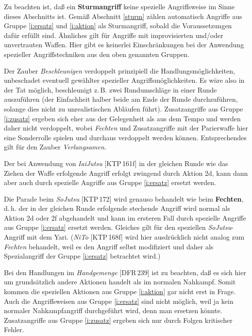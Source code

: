 \documentclass[10pt,a4paper,germanpar]{article}
\begin{document}
Zu beachten ist, daß ein \textbf{Sturmangriff} keine spezielle
Angriffsweise im Sinne dieses Abschnitts ist. Gemäß Abschnitt
\ref{sturm} zählen automatisch Angriffe aus Gruppe \ref{i:ersatz} und
\ref{i:aktion} als Sturmangriff, sobald die Voraussetzungen dafür
erfüllt sind. Ähnliches gilt für Angriffe mit improvisierten und/oder
unvertrauten Waffen. Hier gibt es keinerlei Einschränkungen bei der
Anwendung spezieller Angriffstechniken aus den oben genannten Gruppen.

Der Zauber \emph{Beschleunigen} verdoppelt prinzipiell die
Handlungsmöglichkeiten, unbeschadet eventuell gewählter spezieller
Angriffsmöglichkeiten. Es wäre also in der Tat möglich, beschleunigt
z.\,B. zwei Rundumschläge in einer Runde auszuführen (der Einfachheit
halber beide am Ende der Runde durchzuführen, solange dies nicht zu
unrealistischen Abläufen führt). Zusatzangriffe aus Gruppe
\ref{i:zusatz} ergeben sich eher aus der Gelegenheit als aus dem Tempo
und werden daher nicht verdoppelt, wobei \emph{Fechten} und
Zusatzangriffe mit der Parierwaffe hier eine Sonderrolle spielen und
durchaus verdoppelt werden können. Entsprechendes gilt für den Zauber
\emph{Verlangsamen}.

Der bei Anwendung von \emph{IaiJutsu} [KTP\,161f] in der gleichen
Runde wie das Ziehen der Waffe erfolgende Angriff erfolgt zwingend
durch Aktion 2d, kann dann aber auch durch spezielle Angriffe aus
Gruppe \ref{i:ersatz} ersetzt werden.

Die Parade beim \emph{SoJutsu} [KTP\,172] wird genauso behandelt wie beim
\textbf{Fechten}, d.\,h. der in der gleichen Runde erfolgende
stechende Angriff wird normal als Aktion 2d oder 2f abgehandelt und
kann im ersteren Fall durch spezielle Angriffe aus Gruppe
\ref{i:ersatz} ersetzt werden. Gleiches gilt für den speziellen
\emph{SoJutsu}-Angriff mit dem Yari. (\emph{NiTo} [KTP\,168f] wird
hier ausdrücklich nicht analog zum \emph{Fechten} behandelt, weil es
den Angriff selbst modifiziert und daher als Spezialangriff der Gruppe
\ref{i:ersatz} betrachtet wird.)

Bei den Handlungen im \emph{Handgemenge} [DFR\,239] ist zu beachten,
daß es sich hier um grundsätzlich andere Aktionen handelt als im
normalen Nahkampf. Somit kommen die speziellen Aktionen aus Gruppe
\ref{i:aktion} gar nicht erst in Frage. Auch die Angriffsweisen aus
Gruppe \ref{i:ersatz} sind nicht möglich, weil ja kein normaler
Nahkampfangriff durchgeführt wird, denn man ersetzen
könnte. Zusatzangriffe aus Gruppe \ref{i:zusatz} ergeben sich nur
durch Folgen kritischer Fehler.
\end{document}
